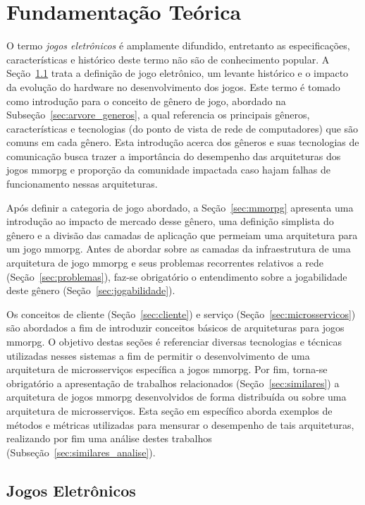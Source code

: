 \chapter{Fundamentação Teórica}
\label{cap2}


O termo \textit{jogos eletrônicos} é amplamente difundido, entretanto as especificações, características e histórico deste termo não são de conhecimento popular.
%
A Seção~\ref{sec:jogos_eletronicos} trata a definição de jogo eletrônico, um levante histórico e o impacto da evolução do hardware no desenvolvimento dos jogos.
%
Este termo é tomado como introdução para o conceito de gênero de jogo, abordado na Subseção~\ref{sec:arvore_generos}, a qual referencia os principais gêneros, características e tecnologias (do ponto de vista de rede de computadores) que são comuns em cada gênero.
%
Esta introdução acerca dos gêneros e suas tecnologias de comunicação busca trazer a importância do desempenho das arquiteturas dos jogos \ac{mmorpg} e proporção da comunidade impactada caso hajam falhas de funcionamento nessas arquiteturas.



Após definir a categoria de jogo abordado, a Seção~\ref{sec:mmorpg} apresenta uma introdução ao impacto de mercado desse gênero, uma definição simplista do gênero e a divisão das camadas de aplicação que permeiam uma arquitetura para um jogo \ac{mmorpg}.
%
Antes de abordar sobre as camadas da infraestrutura de uma arquitetura de jogo \ac{mmorpg} e seus problemas recorrentes relativos a rede (Seção~\ref{sec:problemas}), faz-se obrigatório o entendimento sobre a jogabilidade deste gênero (Seção~\ref{sec:jogabilidade}).


Os conceitos de cliente (Seção~\ref{sec:cliente}) e serviço (Seção~\ref{sec:microsservicos}) são abordados a fim de introduzir conceitos básicos de arquiteturas para jogos \ac{mmorpg}.
%
O objetivo destas seções é referenciar diversas tecnologias e técnicas utilizadas nesses sistemas a fim de permitir o desenvolvimento de uma arquitetura de microsserviços específica a jogos \ac{mmorpg}.
%
Por fim, torna-se obrigatório a apresentação de trabalhos relacionados (Seção~\ref{sec:similares}) a arquitetura de jogos \ac{mmorpg} desenvolvidos de forma distribuída ou sobre uma arquitetura de microsserviços.
%
Esta seção em específico aborda exemplos de métodos e métricas utilizadas para mensurar o desempenho de tais arquiteturas, realizando por fim uma análise destes trabalhos (Subseção~\ref{sec:similares_analise}).


\section{Jogos Eletrônicos}
\label{sec:jogos_eletronicos}


